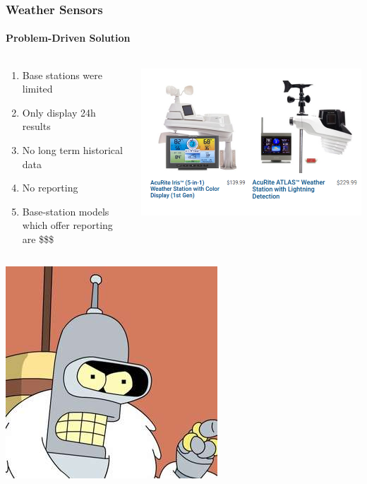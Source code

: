 \documentclass[aspectratio=169]{beamer}
\begin{document}
\begin{frame}[fragile]
  \frametitle{Weather Sensors}
  \framesubtitle{Problem-Driven Solution}
  \begin{columns}[T]
    \begin{column}[T]{0.5\paperwidth}
      \begin{enumerate}
        \item{Base stations were limited}
        \item{Only display 24h results}
        \item{No long term historical data}
        \item{No reporting}
        \item{Base-station models which offer reporting are \$\$\$}
      \end{enumerate}
    \end{column}
    \begin{column}[T]{0.45\paperwidth}
      \includegraphics[width=0.45\paperwidth]{images/cost.png}
    \end{column}
  \end{columns}
\end{frame}

\begin{frame}[fragile]
  \begin{center}
  \includegraphics[height=0.75\paperheight]{images/bender.jpg}
  \end{center}
\end{frame}
\end{document}
